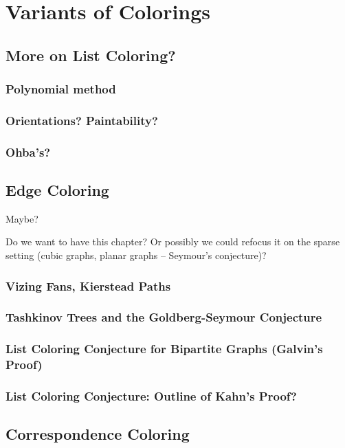 \documentclass[12pt,twoside,openright,a4paper]{book}
\begin{document}
\part{Variants of Colorings}

\chapter{More on List Coloring?}

\section{Polynomial method}

\section{Orientations? Paintability?}
\section{Ohba's?}

\chapter{Edge Coloring}\label{chap:edgecol}

Maybe?

Do we want to have this chapter?  Or possibly we could refocus it on the
sparse setting (cubic graphs, planar graphs -- Seymour's conjecture)?

\section{Vizing Fans, Kierstead Paths}
\section{Tashkinov Trees and the Goldberg-Seymour Conjecture}\label{sec:goseycon}
\section{List Coloring Conjecture for Bipartite Graphs (Galvin's Proof)}
\section{List Coloring Conjecture: Outline of Kahn's Proof?}

\chapter{Correspondence Coloring}\label{chap:corresp}
\end{document}
